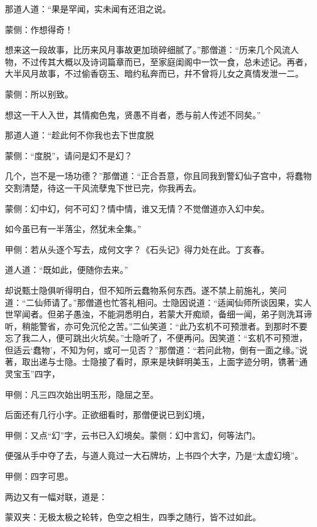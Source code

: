 \begin{parag}
    那道人道：“果是罕闻，实未闻有还泪之说。\begin{note}蒙侧：作想得奇！\end{note}想来这一段故事，比历来风月事故更加琐碎细腻了。”那僧道：“历来几个风流人物，不过传其大概以及诗词篇章而已，至家庭闺阁中一饮一食，总未述记。再者，大半风月故事，不过偷香窃玉、暗约私奔而已，幷不曾将儿女之真情发泄一二。\begin{note}蒙侧：所以别致。\end{note}想这一干人入世，其情痴色鬼，贤愚不肖者，悉与前人传述不同矣。”
\end{parag}


\begin{parag}
    那道人道：“趁此何不你我也去下世度脱\begin{note}蒙侧：“度脱”，请问是幻不是幻？\end{note}几个，岂不是一场功德？”那僧道：“正合吾意，你且同我到警幻仙子宫中，将蠢物交割清楚，待这一干风流孽鬼下世已完，你我再去。\begin{note}蒙侧：幻中幻，何不可幻？情中情，谁又无情？不觉僧道亦入幻中矣。\end{note}如今虽已有一半落尘，然犹未全集。”\begin{note}甲侧：若从头逐个写去，成何文字？《石头记》得力处在此。丁亥春。\end{note}
\end{parag}


\begin{parag}
    道人道：“既如此，便随你去来。”
\end{parag}


\begin{parag}
    却说甄士隐俱听得明白，但不知所云蠢物系何东西。遂不禁上前施礼，笑问道：“二仙师请了。”那僧道也忙答礼相问。士隐因说道：“适闻仙师所谈因果，实人世罕闻者。但弟子愚浊，不能洞悉明白，若蒙大开痴顽，备细一闻，弟子则洗耳谛听，稍能警省，亦可免沉伦之苦。”二仙笑道：“此乃玄机不可预泄者。到那时不要忘了我二人，便可跳出火坑矣。”士隐听了，不便再问。因笑道：“玄机不可预泄，但适云‘蠢物’，不知为何，或可一见否？”那僧道：“若问此物，倒有一面之缘。”说著，取出递与士隐。士隐接了看时，原来是块鲜明美玉，上面字迹分明，镌著“通灵宝玉”四字，\begin{note}甲侧：凡三四次始出明玉形，隐屈之至。\end{note}后面还有几行小字。正欲细看时，那僧便说已到幻境，\begin{note}甲侧：又点“幻”字，云书已入幻境矣。蒙侧：幻中言幻，何等法门。\end{note}便强从手中夺了去，与道人竟过一大石牌坊，上书四个大字，乃是“太虚幻境”。\begin{note}甲侧：四字可思。\end{note}两边又有一幅对联，道是：\begin{note}蒙双夹：无极太极之轮转，色空之相生，四季之随行，皆不过如此。\end{note}
\end{parag}


